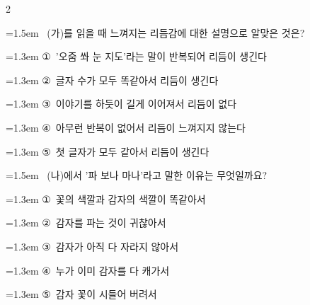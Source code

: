 \documentclass[12pt, a4paper]{article}
\begin{document}
\begin{multicols}{2}
\noindent\begin{minipage}{\columnwidth}
\vspace{2mm}
{\hangindent=1.5em  ~(가)를 읽을 때 느껴지는 리듬감에 대한 설명으로 알맞은 것은?\par}

\vspace{0.5mm}
{\hangindent=1.3em  \noindent\hspace{0.3em}①~'오줌 쏴 눈 지도'라는 말이 반복되어 리듬이 생긴다\par}
{\hangindent=1.3em  \noindent\hspace{0.3em}②~글자 수가 모두 똑같아서 리듬이 생긴다\par}
{\hangindent=1.3em  \noindent\hspace{0.3em}③~이야기를 하듯이 길게 이어져서 리듬이 없다\par}
{\hangindent=1.3em  \noindent\hspace{0.3em}④~아무런 반복이 없어서 리듬이 느껴지지 않는다\par}
{\hangindent=1.3em  \noindent\hspace{0.3em}⑤~첫 글자가 모두 같아서 리듬이 생긴다\par}
\vspace{4mm}
\end{minipage}
\par

\noindent\begin{minipage}{\columnwidth}
\vspace{2mm}
{\hangindent=1.5em  ~(나)에서 '파 보나 마나'라고 말한 이유는 무엇일까요?\par}

\vspace{0.5mm}
{\hangindent=1.3em  \noindent\hspace{0.3em}①~꽃의 색깔과 감자의 색깔이 똑같아서\par}
{\hangindent=1.3em  \noindent\hspace{0.3em}②~감자를 파는 것이 귀찮아서\par}
{\hangindent=1.3em  \noindent\hspace{0.3em}③~감자가 아직 다 자라지 않아서\par}
{\hangindent=1.3em  \noindent\hspace{0.3em}④~누가 이미 감자를 다 캐가서\par}
{\hangindent=1.3em  \noindent\hspace{0.3em}⑤~감자 꽃이 시들어 버려서\par}
\vspace{4mm}
\end{minipage}
\par


\end{multicols}
\end{document}
